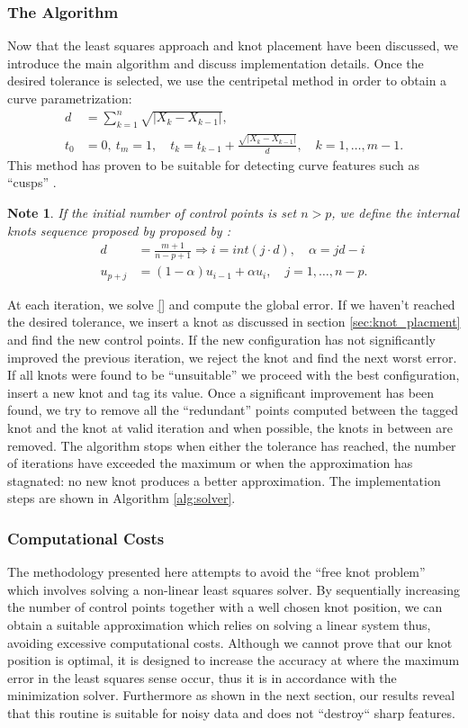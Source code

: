 \documentclass[a4paper,10pt]{article}
\newtheorem{note}{Note}[section]
\begin{document}
\subsubsection{The Algorithm}
Now that the least squares approach and knot placement have been discussed, we introduce the main algorithm and discuss implementation 
details. Once the desired tolerance is selected, we use the centripetal method in order to obtain a curve parametrization: 
\begin{align}
 d &= \sum_{k=1}^n \sqrt {| X_k-X_{k-1}|},\\
 t_0 &=0,\ t_m=1,\quad t_k = t_{k-1} + \frac{\sqrt{|X_k-X_{k-1}|}}{d},\quad k = 1,\ldots, m-1.
 \end{align}
This method has proven to be suitable for detecting curve features such as ``cusps'' \cite{}. 
\begin{note}
 If the initial number of control points is set $n > p$, we define the internal knots sequence proposed by proposed by \cite{}: 
  \begin{align}
  d &= \frac{m+1}{n-p+1} \Rightarrow i = int(j\cdot d),\quad \alpha = jd -i\\
  u_{p+j} &= (1-\alpha)u_{i-1} + \alpha u_i,\quad j = 1,\ldots,n-p.
 \end{align}
\end{note}

At each iteration, we solve \eqref{} and compute the global error. If we haven't reached the desired tolerance, 
we insert a knot as discussed in section \ref{sec:knot_placment} and find the new control points. If the 
new configuration has not significantly improved the previous iteration, we reject the knot and find the next worst error. 
 If all knots were found to be ``unsuitable'' we proceed with the best configuration, insert a new knot and tag its 
 value. Once a significant improvement has been found, we try to remove all the ``redundant'' points computed between the tagged knot and the 
 knot at valid iteration and when possible, the knots in between are removed. The algorithm stops when either the tolerance has reached, 
 the number of iterations have exceeded the maximum or when the approximation has stagnated: no new knot 
 produces a better approximation. The implementation steps are shown in Algorithm \ref{alg:solver}. 


\subsubsection{Computational Costs}
The methodology presented here attempts to avoid the ``free knot problem'' which involves solving a non-linear 
least squares solver. By sequentially increasing the number of control points together with a well chosen knot 
position, we can obtain a suitable approximation which relies on solving a linear system thus, avoiding excessive 
computational costs. Although we cannot prove that our knot position is optimal, it is designed to increase the accuracy 
 at where the maximum error in the least squares sense occur,
  thus it is in accordance with the minimization solver. 
  Furthermore as shown in the next section, our results reveal that this routine is suitable for 
   noisy data and does not ``destroy`` sharp features. 
   
\end{document}
